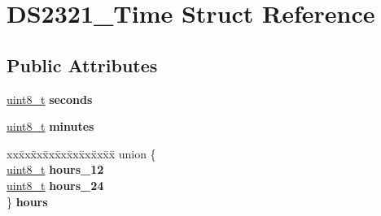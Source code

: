 \hypertarget{structDS2321__Time}{}\section{D\+S2321\+\_\+\+Time Struct Reference}
\label{structDS2321__Time}
\subsection*{Public Attributes}
\begin{DoxyCompactItemize}
\item 
\mbox{\label{structDS2321__Time_ae95c0b267aa6bf3568c3fcce1298872d}} 
\hyperlink{vl53l0x__types_8h_aba7bc1797add20fe3efdf37ced1182c5}{uint8\+\_\+t} {\bfseries seconds}
\item 
\mbox{\label{structDS2321__Time_a3d7b7d99aef9efa2ee72bf14948e2622}} 
\hyperlink{vl53l0x__types_8h_aba7bc1797add20fe3efdf37ced1182c5}{uint8\+\_\+t} {\bfseries minutes}
\item 
\mbox{\label{structDS2321__Time_af857518f7cbb98dc3f96a32261789617}} 
\begin{tabbing}
xx\=xx\=xx\=xx\=xx\=xx\=xx\=xx\=xx\=\kill
union \{\\
\>\hyperlink{vl53l0x__types_8h_aba7bc1797add20fe3efdf37ced1182c5}{uint8\_t} {\bfseries hours\_12}\\
\>\hyperlink{vl53l0x__types_8h_aba7bc1797add20fe3efdf37ced1182c5}{uint8\_t} {\bfseries hours\_24}\\
\} {\bfseries hours}\\


\end{tabbing}
\end{DoxyCompactItemize}
